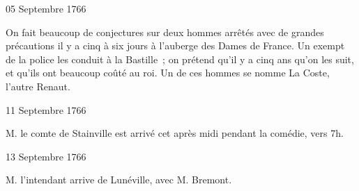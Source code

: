                      \begin{diary}{05 Septembre 1766}{}
                        
                         On fait beaucoup de conjectures sur
                           deux
                           hommes arrêtés avec de grandes précautions
                           il y a cinq à six jours à l’auberge des
                              Dames de France. Un exempt de la police
                           les conduit à la Bastille ;
                           on prétend qu’il
                           y a cinq ans qu’on les suit, et qu’ils ont
                           beaucoup coûté au roi. Un de
                           ces
                           hommes se nomme La Coste,
                           l’autre Renaut. \bigskip
        
        
                     \end{diary}

                     \begin{diary}{11 Septembre 1766}{}
                        
                        
                           M. le comte de Stainville est
                           arrivé cet
                           après midi pendant la comédie, vers 7h. \bigskip
        
        
                     \end{diary}

                     \begin{diary}{13 Septembre 1766}{}
                        
                        
                           M. l’intendant arrive de
                              Lunéville, avec M.
                              Bremont.
                        \bigskip
        
        
                     \end{diary}


